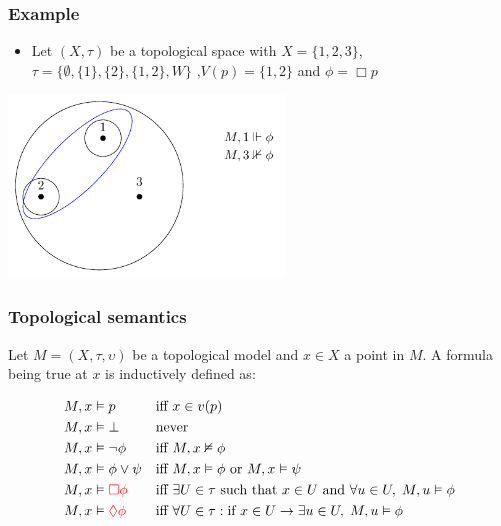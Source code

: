 \documentclass[hyperref={pdfpagelabels=false},t,10pt]{beamer}
\begin{document}
  \begin{frame}
  
    \frametitle{Example}
    \begin{itemize}
      \item  Let $(X,\tau)$ be a topological space with 
      $X = \{1,2,3\}$, $\tau = \{\emptyset, \{1\}, \{2\}, \{1,2\}, W\}$ ,$V(p) = \{1,2\}$  and $\phi = \Box p$
      \pause
    \end{itemize}
    \centering
    \includegraphics[width=0.55\textwidth]{Example2.pdf}

  \end{frame}


\begin{frame}
  \frametitle{Topological semantics}
  \begin{definition}
  Let $M = (X, \tau, \upsilon)$ be a topological model and $x \in X$ a point in $M$. A formula being true at $x$ is inductively defined as:

  \[
\begin{aligned}
    M, x &\vDash p &&\text{iff } x \in v(p) \\
    M, x &\vDash \bot &&\text{never} \\
    M, x &\vDash \neg \phi &&\text{iff } M, x \nvDash \phi \\
    M, x &\vDash \phi \lor \psi &&\text{iff } M, x \vDash \phi \text{ or } M, x \vDash \psi \\
    M, x &\vDash \textcolor{red}{\Box \phi} &&\text{iff }\exists U \in \tau \text{ such that } x \in U \text{ and } \forall u \in U,\; M, u \vDash \phi \\
    M, x &\vDash \textcolor{red}{\lozenge \phi} &&\text{iff }\forall U \in \tau: \text{if }x \in U \rightarrow \exists u \in U,\; M, u \vDash \phi
  \end{aligned}
\]
\end{definition}
\end{frame}
\end{document}
